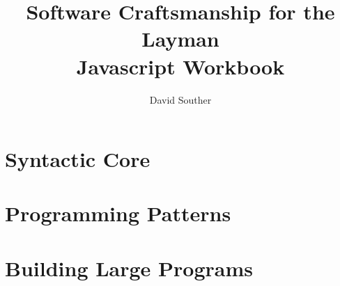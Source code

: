 \documentclass{scrreprt}
\begin{document}
\setcounter{chapter}{-1}

\title{Software Craftsmanship for the Layman \\ Javascript Workbook}

\author{David Souther}
\maketitle

\tableofcontents
\newpage




\part{Syntactic Core}

%
%
%

\part{Programming Patterns}
%
%
%
%
%

\part{Building Large Programs}
%
%
%
%
\end{document}
